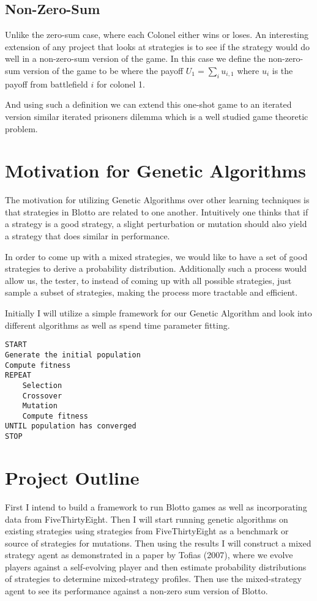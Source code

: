 \documentclass[12pt,letter]{article}
\begin{document}
\subsection{Non-Zero-Sum}
Unlike the zero-sum case, where each Colonel either wins or loses. An interesting extension of any project that looks at strategies is to see if the strategy would do well in a non-zero-sum version of the game. In this case we define the non-zero-sum version of the game to be where the payoff $U_1 = \sum_i u_{i, 1}$ where $u_i$ is the payoff from battlefield $i$ for colonel 1.

And using such a definition we can extend this one-shot game to an iterated version similar iterated prisoners dilemma which is a well studied game theoretic problem.

\section{Motivation for Genetic Algorithms} %
The motivation for utilizing Genetic Algorithms over other learning techniques is that strategies in Blotto are related to one another. Intuitively one thinks that if a strategy is a good strategy, a slight perturbation or mutation should also yield a strategy that does similar in performance.

In order to come up with a mixed strategies, we would like to have a set of good strategies to derive a probability distribution. Additionally such a process would allow us, the tester, to instead of coming up with all possible strategies, just sample a subset of strategies, making the process more tractable and efficient.

Initially I will utilize a simple framework for our Genetic Algorithm and look into different algorithms as well as spend time parameter fitting.
\begin{lstlisting}[mathescape, tabsize=4, basicstyle=\fontfamily{lmvtt}\selectfont,]
START
Generate the initial population
Compute fitness
REPEAT
    Selection
    Crossover
    Mutation
    Compute fitness
UNTIL population has converged
STOP
\end{lstlisting}
\section{Project Outline} %
First I intend to build a framework to run Blotto games as well as incorporating data from FiveThirtyEight. Then I will start running genetic algorithms on existing strategies using strategies from FiveThirtyEight as a benchmark or source of strategies for mutations. Then using the results I will construct a mixed strategy agent as demonstrated in a paper by Tofias (2007), where we evolve players against a self-evolving player and then estimate probability distributions of strategies to determine mixed-strategy profiles. Then use the mixed-strategy agent to see its performance against a non-zero sum version of Blotto. 
\end{document}
